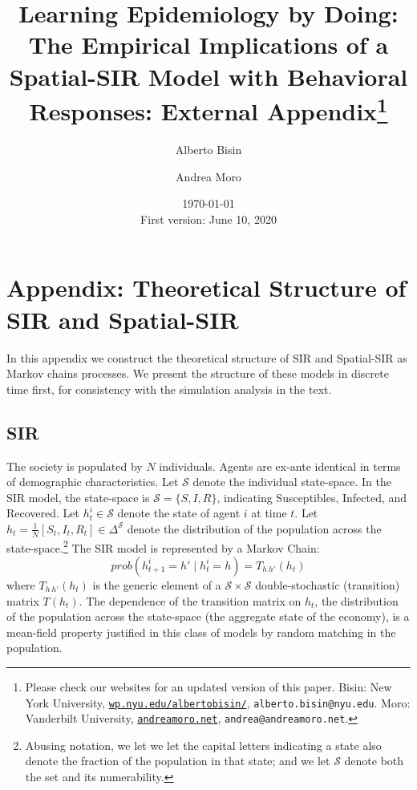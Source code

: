 \documentclass[english,11pt]{article}
\begin{document}
\setcounter{footnote}{3}
\author{
    Alberto Bisin 
    \and 
    Andrea Moro}

\title{Learning Epidemiology by Doing: \\ The Empirical Implications of a Spatial-SIR Model with Behavioral Responses: External Appendix\thanks{Please check our websites
for an updated version of this paper. 
Bisin: New York University, \href{https://wp.nyu.edu/albertobisin/}{\texttt{wp.nyu.edu/albertobisin/}}, 
\texttt{alberto.bisin@nyu.edu}. Moro: Vanderbilt University, \href{https://andreamoro.net}{\texttt{andreamoro.net}}, \texttt{andrea@andreamoro.net}.}
}
\date{\today \\ {\small First version: June 10, 2020}}
\maketitle


\appendix
\renewcommand\thefigure{\thesection.\arabic{figure}}    


\section{Appendix: Theoretical Structure of SIR and Spatial-SIR } \label{sec:app_theory}

In this appendix we construct the theoretical structure of SIR and Spatial-SIR as Markov chains processes. We present the structure of these models in discrete time first, for consistency with the simulation analysis in the text.

\subsection{SIR}  The society is populated by $N$ individuals. Agents are ex-ante identical in terms of demographic characteristics. Let $\mathcal{S}$ denote the individual state-space. In the SIR model, the state-space is $\mathcal{S}=\{S, I, R\}$, indicating Susceptibles, Infected, and Recovered. 
Let  $h^i_t \in \mathcal{S}$ denote the state of agent $i$ at time $t$. Let $h_t=\frac{1}{N}[S_t,I_t,R_t] \in \Delta^{\mathcal{S}}$ denote the distribution of the population across the state-space.\footnote{Abusing notation, we let we let the capital letters indicating a state also denote the fraction of the population in that state; and we let  $\mathcal{S}$ denote both the set and its numerability.}
The SIR model is represented by a Markov Chain: 
$$ prob(h^i_{t+1}=h' \mid h^i_t=h)= T_{h \: h'}(h_t)$$ where $T_{h \: h'}(h_t)$ is the generic element of a  $\mathcal{S} \times \mathcal{S}$ double-stochastic (transition) matrix $T(h_t)$. The dependence of the transition matrix on $h_t$, the distribution of the population across the state-space (the aggregate state of the economy), is a mean-field property justified in this class of models by random matching in the population.  
\end{document}
